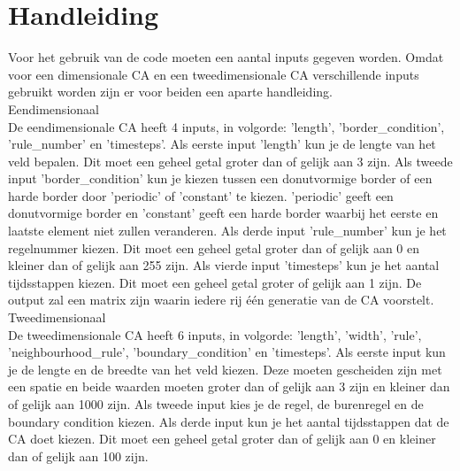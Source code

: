 \documentclass[12pt,a4paper]{article}
\begin{document}
\section*{Handleiding}
Voor het gebruik van de code moeten een aantal inputs gegeven worden. Omdat voor een dimensionale CA en een tweedimensionale CA verschillende inputs gebruikt worden zijn er voor beiden een aparte handleiding. \\
\newline\large{Eendimensionaal} \\
\newline\normalsize De eendimensionale CA heeft 4 inputs, in volgorde: 'length', 'border\_condition', 'rule\_number' en 'timesteps'. Als eerste input 'length' kun je de lengte van het veld bepalen. Dit moet een geheel getal groter dan of gelijk aan 3 zijn. Als tweede input 'border\_condition' kun je kiezen tussen een donutvormige border of een harde border door 'periodic' of 'constant' te kiezen. 'periodic' geeft een donutvormige border en 'constant' geeft een harde border waarbij het eerste en laatste element niet zullen veranderen. Als derde input 'rule\_number' kun je het regelnummer kiezen. Dit moet een geheel getal groter dan of gelijk aan 0 en kleiner dan of gelijk aan 255 zijn. Als vierde input 'timesteps' kun je het aantal tijdsstappen kiezen. Dit moet een geheel getal groter of gelijk aan 1 zijn. De output zal een matrix zijn waarin iedere rij één generatie van de CA voorstelt.\\
\newline\large{Tweedimensionaal} \\
\newline\normalsize De tweedimensionale CA heeft 6 inputs, in volgorde: 'length', 'width', 'rule', 'neighbourhood\_rule', 'boundary\_condition' en 'timesteps'. Als eerste input kun je de lengte en de breedte van het veld kiezen. Deze moeten gescheiden zijn met een spatie en beide waarden moeten groter dan of gelijk aan 3 zijn en kleiner dan of gelijk aan 1000 zijn. Als tweede input kies je de regel, de burenregel en de boundary condition kiezen. Als derde input kun je het aantal tijdsstappen dat de CA doet kiezen. Dit moet een geheel getal groter dan of gelijk aan 0 en kleiner dan of gelijk aan 100 zijn.
\newpage
\end{document}
